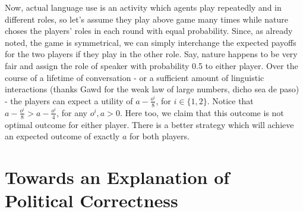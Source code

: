 \documentclass[10]{article}
\begin{document}
Now, actual language use is an activity which agents play repeatedly and in different roles, so let's assume they play above game many times while nature choses the players' roles in each round with equal probability. Since, as already noted, the game is symmetrical, we can simply interchange the expected payoffs for the two players if they play in the other role. Say, nature happens to be very fair and assign the role of speaker with probability 0.5 to either player. Over the course of a lifetime of conversation - or a sufficient amount of linguistic interactions (thanks Gawd for the weak law of large numbers, dicho sea de paso) - the players can expect a utility of $a-\tfrac{o^i}{8}$, for $i\in \{1,2\}$. Notice that $a-\tfrac{o^i}{8} > a-\tfrac{o^i}{4}$, for any $o^i,a>0$. %
Here too, we claim that this outcome is not optimal outcome for either player. There is a better strategy which will achieve an expected outcome of exactly $a$ for both players. 

\begin{comment}
Starting from Spence's seminal "Job Market Signalling", much has been written about games where by sending a message an agent causes a cost. This is the core of so-called \textit{costly signalling games}. Particularly economic theory has been interested in this twist of the Lewisian signaling model.\\
Common assumptions here are that the message's meaning is determined before the start of the game and that sender's cost vector is common knowledge, which, in turn, allows the receiver to distinguish credible and non-credible signals.\\


\begin{table}[h]
\centering
\begin{tabular}{lllll}
States & Cost Sender & Messages & {Cost Receiver} & {Actions} \\ 
$t_1$  & c           & $m_1$    & 0                                  & $a_1$                        \\
$t_2$  & c           & $m_2$    & 0                                  & $a_2$                       
\end{tabular}
\end{table} 
\end{comment}

\section{Towards an Explanation of Political Correctness}
\end{document}
